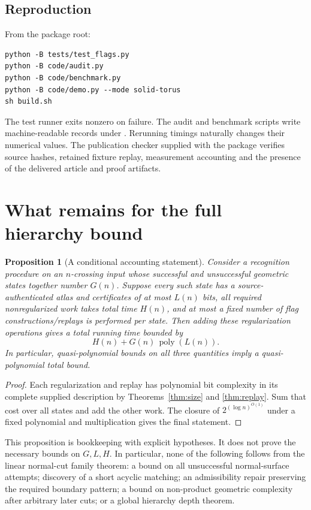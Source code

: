 \documentclass[11pt]{article}
\newtheorem{proposition}[theorem]{Proposition}
\theoremstyle{definition}\newtheorem{definition}[theorem]{Definition}
\theoremstyle{remark}\newtheorem{remark}[theorem]{Remark}
\newcommand{\poly}{\operatorname{poly}}
\newcommand{\code}[1]{\texttt{\detokenize{#1}}}
\begin{document}
\subsection{Reproduction}
From the package root:
\begin{verbatim}
python -B tests/test_flags.py
python -B code/audit.py
python -B code/benchmark.py
python -B code/demo.py --mode solid-torus
sh build.sh
\end{verbatim}
The test runner exits nonzero on failure. The audit and benchmark scripts write machine-readable records under \code{results/}. Rerunning timings naturally changes their numerical values. The publication checker supplied with the package verifies source hashes, retained fixture replay, measurement accounting and the presence of the delivered article and proof artifacts.

\section{What remains for the full hierarchy bound}
\label{sec:hierarchy}

\begin{proposition}[A conditional accounting statement]\label{prop:global}
Consider a recognition procedure on an \(n\)-crossing input whose successful and unsuccessful geometric states together number \(G(n)\). Suppose every such state has a source-authenticated atlas and certificates of at most \(L(n)\) bits, all required nonregularized work takes total time \(H(n)\), and at most a fixed number of flag constructions/replays is performed per state. Then adding these regularization operations gives a total running time bounded by
\[
                          H(n)+G(n)\,\poly(L(n)).
\]
In particular, quasi-polynomial bounds on all three quantities imply a quasi-polynomial total bound.
\end{proposition}
\begin{proof}
Each regularization and replay has polynomial bit complexity in its complete supplied description by Theorems~\ref{thm:size} and \ref{thm:replay}. Sum that cost over all states and add the other work. The closure of \(2^{(\log n)^{O(1)}}\) under a fixed polynomial and multiplication gives the final statement.
\end{proof}

This proposition is bookkeeping with explicit hypotheses. It does not prove the necessary bounds on \(G,L,H\). In particular, none of the following follows from the linear normal-cut family theorem: a bound on all unsuccessful normal-surface attempts; discovery of a short acyclic matching; an admissibility repair preserving the required boundary pattern; a bound on non-product geometric complexity after arbitrary later cuts; or a global hierarchy depth theorem.
\end{document}
